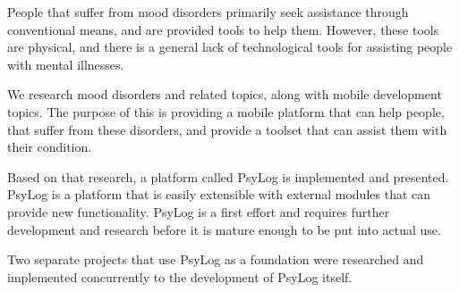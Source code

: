 People that suffer from mood disorders primarily seek assistance through conventional means, and are provided tools to help them.
However, these tools are physical, and there is a general lack of technological tools for assisting people with mental illnesses.

We research mood disorders and related topics, along with mobile development topics.
The purpose of this is providing a mobile platform that can help people, that suffer from these disorders, and provide a toolset that can assist them with their condition.

Based on that research, a platform called PsyLog is implemented and presented.
PsyLog is a platform that is easily extensible with external modules that can provide new functionality.
PsyLog is a first effort and requires further development and research before it is mature enough to be put into actual use.

Two separate projects that use PsyLog as a foundation were researched and implemented concurrently to the development of PsyLog itself. 
